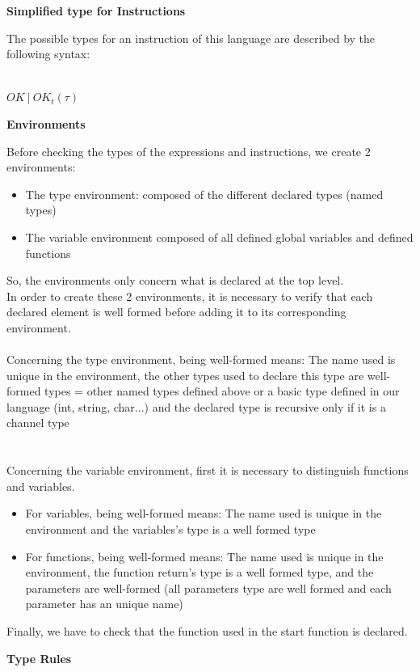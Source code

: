 \documentclass[11pt]{report}
\begin{document}
\tabto{0cm} {\Large \textbf{Simplified type for Instructions}}

\tabto{0cm}The possible types for an instruction of this language are described by the following syntax:
\\ \\
\centerline{$OK \ | \ OK_t(\tau)$}

\tabto{0cm} {\Large \textbf{Environments}}

\tabto{0cm} Before checking the types of the expressions and instructions, we create 2 environments:
\begin{itemize}
\item The type environment: composed of the different declared types (named types)
\item The variable environment composed of all defined global variables and defined functions
\end{itemize}
So, the environments only concern what is declared at the top level.\\

In order to create these 2 environments, it is necessary to verify that each declared element is well formed before adding it to its corresponding environment.\\ \\
Concerning the type environment, being well-formed means: 
The name used is unique in the environment, the other types used to declare this type are well-formed types = other named types defined above or a basic type defined in our language (int, string, char...) and the declared type is recursive only if it is a channel type\\ \\ \\
Concerning the variable environment, first it is  necessary to distinguish functions and variables.
\begin{itemize}
    \item  For variables, being well-formed means: The name used is unique in the environment and the variables's type is a well formed type
    \item For functions, being well-formed means: The name used is unique in the environment, the function return's type is a well formed type, and the parameters are well-formed (all parameters type are well formed and each parameter has an unique name)
\end{itemize}
Finally, we have to check that the function used in the start function is declared.

\newpage
\centerline{\textbf{\Huge Type Rules}}
\vspace*{35pt}
\end{document}
